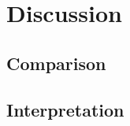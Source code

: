 \section{Discussion}\label{section::discussion}

\subsection{Comparison}

\subsection{Interpretation}